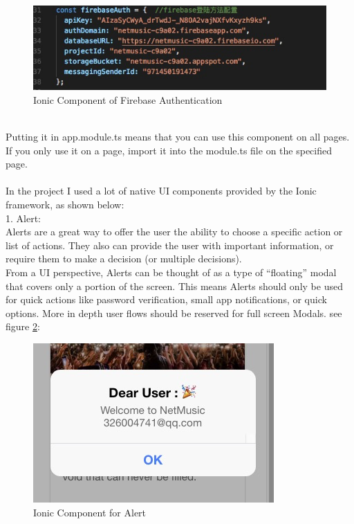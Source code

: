 \begin{figure}[h]
	\centering
	\includegraphics[scale=0.5]{img/ioniccomponent3.png}
	\caption{Ionic Component of Firebase Authentication}
	\label{fig:6.5 cubed graph}
\end{figure} \\
Putting it in app.module.ts means that you can use this component on all pages. If you only use it on a page, import it into the module.ts file on the specified page.
\\ \\
In the project I used a lot of native UI components provided by the Ionic framework, as shown below: \\
1. Alert: \\ Alerts are a great way to offer the user the ability to choose a specific action or list of actions. They also can provide the user with important information, or require them to make a decision (or multiple decisions). \\ From a UI perspective, Alerts can be thought of as a type of “floating” modal that covers only a portion of the screen. This means Alerts should only be used for quick actions like password verification, small app notifications, or quick options. More in depth user flows should be reserved for full screen Modals. see figure \ref{fig:6.6 cubed graph}:
\begin{figure}[h]
	\centering
	\includegraphics[scale=0.6]{img/ionicAlerts.png}
	\caption{Ionic Component for Alert}
	\label{fig:6.6 cubed graph}
\end{figure} \\
